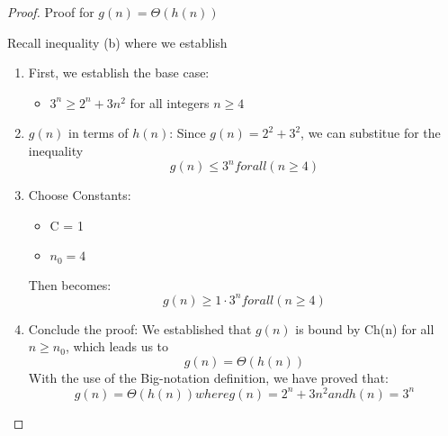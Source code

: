 \documentclass[11pt]{article}
\newcounter{prnum}
\newenvironment{problem}{{\vskip 0.2in\noindent\bf Problem
       \addtocounter{prnum}{1} \arabic{prnum}.}}{\vskip 0.1in}
\begin{document}
\begin{problem}
  \begin{proof}
  Proof for $g(n) = \Theta(h(n))$

    \item Recall inequality (b) where we establish
    \begin{enumerate}
        \item First, we establish the base case:
        \begin{itemize}
          \item $3^n \geq 2^n + 3n^2$ for all integers $n \geq 4$ 
        \end{itemize}
      \item $g(n)$ in terms of $h(n)$: Since $g(n) = 2^2 + 3^2$,
        we can substitue for the inequality
        \begin{equation}
          g(n) \leq 3^n for all (n\geq4)
        \end{equation}

      \item Choose Constants:
        \begin{itemize}
          \item C = 1
          \item $n_0 = 4$
        \end{itemize}
        Then becomes: 
        \begin{equation*}
          g(n) \geq 1\cdot3^n for all (n\geq4)
        \end{equation*}
      \item Conclude the proof: We established that $g(n)$ 
        is bound by C\cdot h(n) for all $n\geq n_0$, which leads us to 
        \begin{equation} 
          g(n) = \Theta(h(n))
        \end{equation}
With the use of the Big-\Theta notation definition, we have proved that:
\begin{equation}
  g(n) = \Theta(h(n)) where g(n) = 2^n + 3n^2
  and 
  h(n) = 3^n
\end{equation}
    \end{enumerate} 
  \end{proof}
\end{problem}
\end{document}
